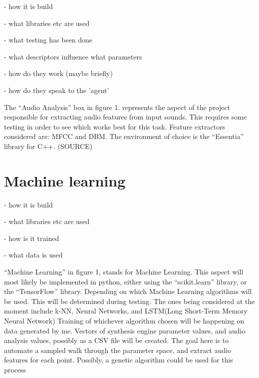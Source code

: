 - how it is build

- what libraries etc are used

- what testing has been done

- what descriptors influence what parameters

- how do they work (maybe briefly)

- how do they speak to the 'agent' 

The ``Audio Analysis'' box in figure 1. represents the aspect of the project
responsible for extracting audio features from input sounds. This requires some
testing in order to see which works best for this task. Feature extractors
considered are: MFCC and DBM. The environment of choice is the ``Essentia''
library for C++. (SOURCE) 

\section{Machine learning}

- how it is build

- what libraries etc are used

- how is it trained

- what data is used

``Machine Learning'' in figure 1, stands for Machine Learning. This aspect will
most likely be implemented in python, either using the
``scikit.learn''
library, or the
``TensorFlow''
library. Depending on which
Machine Learning algorithms will be used. This will be determined during
testing. The ones being considered at the moment include k-NN, Neural Networks,
and LSTM(Long Short-Term Memory Neural Network)
Training of whichever algorithm chosen will be happening on data generated by
me. Vectors of synthesis engine parameter values, and audio analysis values,
possibly as a CSV file will be created. The goal here is to automate a sampled
walk through the parameter space, and extract audio features for each point.
Possibly,  a genetic algorithm could be
used for this process
